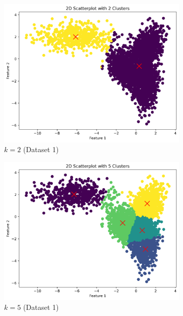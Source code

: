 \documentclass{article}
\begin{document}
\begin{figure}[h]
    \centering
    \begin{subfigure}[b]{0.45\textwidth}
        \includegraphics[width=\textwidth]{figures/2d_scatter_k2_d0.png}
        \caption{$k=2$ (Dataset 1)}
        \label{fig:2d_k2}
    \end{subfigure}
    \begin{subfigure}[b]{0.45\textwidth}
        \includegraphics[width=\textwidth]{figures/2d_scatter_k5_d0.png}
        \caption{$k=5$ (Dataset 1)}
        \label{fig:2d_k5}
    \end{subfigure}
    \begin{subfigure}[b]{0.45\textwidth}

\end{subfigure}
\end{figure}
\end{document}
